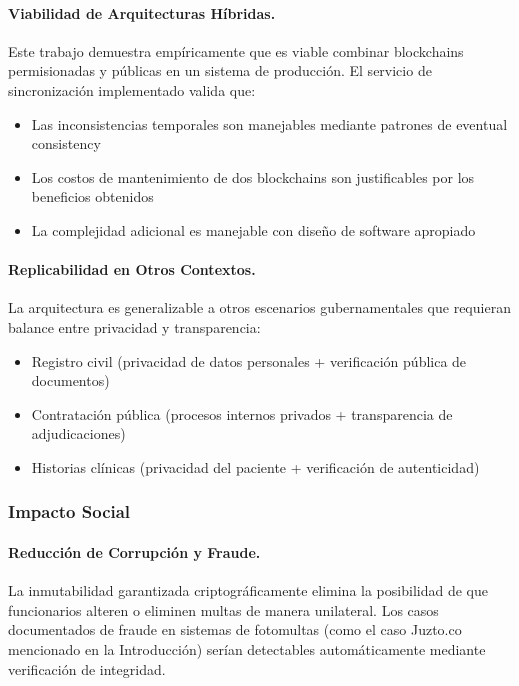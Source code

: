 \paragraph{Viabilidad de Arquitecturas Híbridas.}
Este trabajo demuestra empíricamente que es viable combinar blockchains permisionadas y públicas en un sistema de producción. El servicio de sincronización implementado valida que:
\begin{itemize}
    \item Las inconsistencias temporales son manejables mediante patrones de eventual consistency
    \item Los costos de mantenimiento de dos blockchains son justificables por los beneficios obtenidos
    \item La complejidad adicional es manejable con diseño de software apropiado
\end{itemize}

\paragraph{Replicabilidad en Otros Contextos.}
La arquitectura es generalizable a otros escenarios gubernamentales que requieran balance entre privacidad y transparencia:
\begin{itemize}
    \item Registro civil (privacidad de datos personales + verificación pública de documentos)
    \item Contratación pública (procesos internos privados + transparencia de adjudicaciones)
    \item Historias clínicas (privacidad del paciente + verificación de autenticidad)
\end{itemize}

\subsubsection{Impacto Social}

\paragraph{Reducción de Corrupción y Fraude.}
La inmutabilidad garantizada criptográficamente elimina la posibilidad de que funcionarios alteren o eliminen multas de manera unilateral. Los casos documentados de fraude en sistemas de fotomultas (como el caso Juzto.co mencionado en la Introducción) serían detectables automáticamente mediante verificación de integridad.

